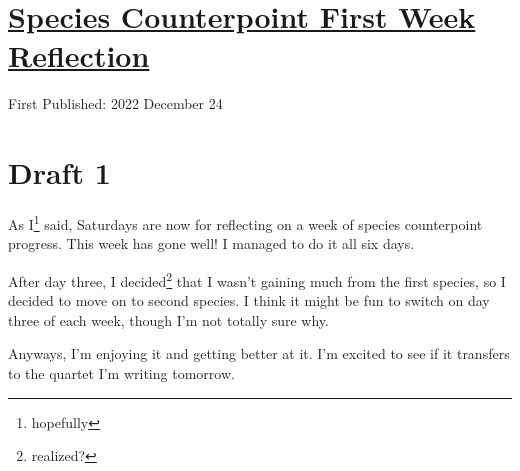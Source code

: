 \documentclass[12pt]{article}[titlepage]
\newcommand{\1}{\={a}}
\newcommand{\2}{\={e}}
\newcommand{\3}{\={\i}}
\newcommand{\4}{\=o}
\newcommand{\5}{\=u}
\newcommand{\6}{\={A}}
\renewcommand{\,}{\textsuperscript{,}}
\begin{document}
\doublespacing
\section{\href{species-counterpoint-week-1.html}{Species Counterpoint First Week Reflection}}
First Published: 2022 December 24

\section{Draft 1}
As I\footnote{hopefully} said, Saturdays are now for reflecting on a week of species counterpoint progress.
This week has gone well!
I managed to do it all six days.

After day three, I decided\footnote{realized?} that I wasn't gaining much from the first species, so I decided to move on to second species.
I think it might be fun to switch on day three of each week, though I'm not totally sure why.

Anyways, I'm enjoying it and getting better at it.
I'm excited to see if it transfers to the quartet I'm writing tomorrow.
\end{document}

